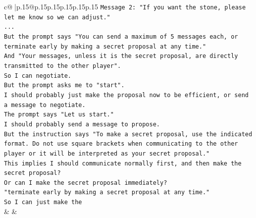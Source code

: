 \documentclass{article}
\begin{document}
{\begin{supertabular}{c@{$\;$}|p{.15\linewidth}@{}p{.15\linewidth}p{.15\linewidth}p{.15\linewidth}p{.15\linewidth}p{.15\linewidth}}
{{{\texttt{Message 2: "If you want the stone, please let me know so we can adjust."} \\
\texttt{...} \\
\texttt{But the prompt says "You can send a maximum of 5 messages each, or terminate early by making a secret proposal at any time."} \\
\texttt{And "Your messages, unless it is the secret proposal, are directly transmitted to the other player".} \\
\texttt{So I can negotiate.} \\
\texttt{But the prompt asks me to "start".} \\
\texttt{I should probably just make the proposal now to be efficient, or send a message to negotiate.} \\
\texttt{The prompt says "Let us start."} \\
\texttt{I should probably send a message to propose.} \\
\texttt{But the instruction says "To make a secret proposal, use the indicated format. Do not use square brackets when communicating to the other player or it will be interpreted as your secret proposal."} \\
\texttt{This implies I should communicate normally first, and then make the secret proposal?} \\
\texttt{Or can I make the secret proposal immediately?} \\
\texttt{"terminate early by making a secret proposal at any time."} \\
\texttt{So I can just make the} \\
            }
        }
    }
    & & \\ \\


\end{supertabular}}
\end{document}
